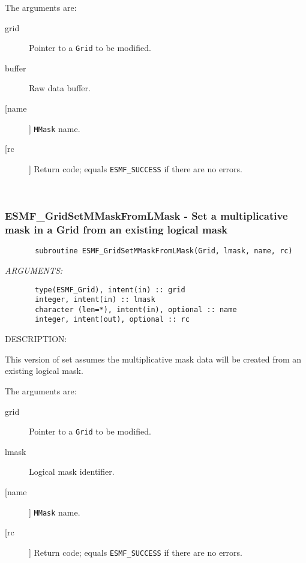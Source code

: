        The arguments are:
       \begin{description}
       \item[grid]
            Pointer to a {\tt Grid} to be modified.
       \item[buffer]
            Raw data buffer.
       \item [[name]]
             {\tt MMask} name.
       \item[[rc]]
            Return code; equals {\tt ESMF\_SUCCESS} if there are no errors.
       \end{description}
   
 
\mbox{}\hrulefill\ 
 
\subsubsection{ESMF\_GridSetMMaskFromLMask - Set a multiplicative mask in a Grid from an existing logical mask}


 
\begin{verbatim}       subroutine ESMF_GridSetMMaskFromLMask(Grid, lmask, name, rc)\end{verbatim}{\em ARGUMENTS:}
\begin{verbatim}       type(ESMF_Grid), intent(in) :: grid
       integer, intent(in) :: lmask
       character (len=*), intent(in), optional :: name
       integer, intent(out), optional :: rc\end{verbatim}
{\sf DESCRIPTION:\\ }


       This version of set assumes the multiplicative mask data will be
       created from an existing logical mask.
  
       The arguments are:
       \begin{description}
       \item[grid]
            Pointer to a {\tt Grid} to be modified.
       \item[lmask]
            Logical mask identifier.
       \item [[name]]
             {\tt MMask} name.
       \item[[rc]]
            Return code; equals {\tt ESMF\_SUCCESS} if there are no errors.
       \end{description}
   
 

